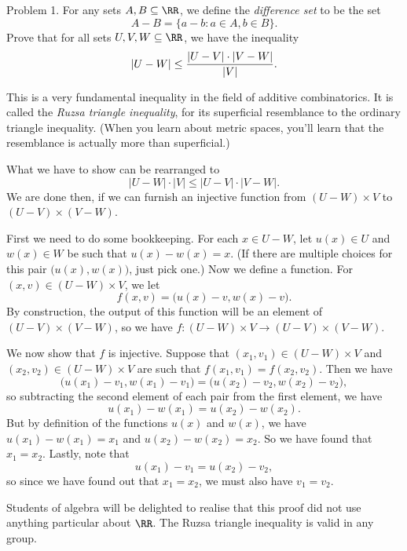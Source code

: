 


\def\To{\Rightarrow}



\bigskip

\proclaim Problem 1. For any sets $A, B\subseteq \RR$, we define the {\it difference set}
to be the set
$$A - B = \{ a- b : a\in A, b\in B\}.$$
Prove that for all sets $U,V,W\subseteq \RR$, we have the inequality
$$|U-W| \le {|U-V| \cdot |V-W|\over |V|}.$$

This
is a very fundamental inequality in the field of additive combinatorics. It is called the
{\it Ruzsa triangle inequality}, for its superficial resemblance to the ordinary triangle inequality.
(When you learn about metric spaces, you'll learn that the resemblance is actually more
than superficial.)

\proof What we have to show can be rearranged to
$$ |U-W| \cdot |V| \le |U-V|\cdot |V-W|.$$
We are done then, if we can furnish an injective function from $(U-W)\times V$
to $(U-V)\times (V-W)$.

First we need to do some bookkeeping. For each $x\in U-W$, let
$u(x)\in U$ and $w(x)\in W$ be such that $u(x) - w(x) = x$. (If there are multiple choices for
this pair $\bigl( u(x), w(x)\bigr)$, just pick one.) Now we define a function.
For $(x,v)\in (U-W)\times V$, we let
$$f(x,v) = \bigl( u(x) - v, w(x) - v\bigr).$$
By construction, the output of this function will be an element of $(U-V)\times(V-W)$, so we have
$f : (U-W)\times V \to (U-V)\times (V-W)$.

We now show that $f$ is injective. Suppose that $(x_1, v_1)\in (U-W)\times V$ and
$(x_2, v_2)\in (U-W)\times V$ are such that $f(x_1,v_1) = f(x_2,v_2)$. Then
we have
$$\bigl( u(x_1) - v_1, w(x_1) - v_1 \bigr) = \bigr( u(x_2) - v_2, w(x_2) - v_2\bigr),$$
so subtracting the second element of each pair from the first element, we have
$$ u(x_1) - w(x_1) = u(x_2) - w(x_2).$$
But by definition of the functions $u(x)$ and $w(x)$, we have $u(x_1) - w(x_1) = x_1$
and $u(x_2) - w(x_2) = x_2$. So we have found that $x_1 = x_2$. Lastly, note that
$$u(x_1) - v_1 = u(x_2) - v_2,$$
so since we have found out that $x_1 = x_2$, we must also have $v_1 = v_2$.\slug

Students of algebra will be delighted to realise that this proof did not use anything particular
about $\RR$. The Ruzsa triangle inequality is valid in any group.

